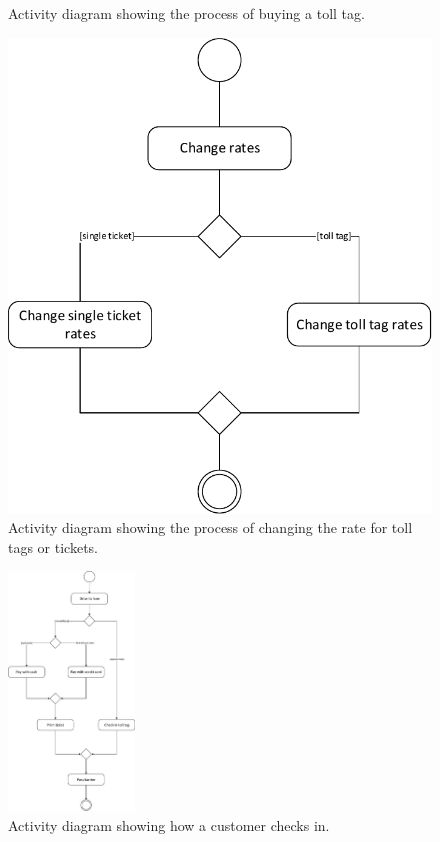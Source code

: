 \begin{figure}[H]
\begin{minipage}{0.3\textwidth}
	\caption{Activity diagram showing the process of buying a toll tag.}
	\end{minipage}
	\hfill
	\begin{minipage}{0.5\textwidth}
	\includegraphics[width=\textwidth]{img/activity_diagram/change_rates}
	\caption{Activity diagram showing the process of changing the rate for toll tags or tickets.}
	\end{minipage}
\end{figure}


\begin{figure}[H]
	\centering
	\includegraphics[width=0.3\textwidth]{img/activity_diagram/check_in}
	\caption{Activity diagram showing how a customer checks in.}
\end{figure}

